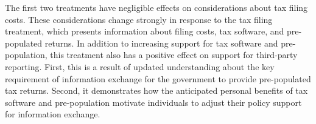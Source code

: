 \documentclass[12pt]{article}
\begin{document}
The first two treatments have negligible effects on considerations about tax filing costs. These considerations change strongly in response to the tax filing treatment, which presents information about filing costs, tax software, and pre-populated returns. In addition to increasing support for tax software and pre-population, this treatment also has a positive effect on support for third-party reporting. First, this is a result of updated understanding about the key requirement of information exchange for the government to provide pre-populated tax returns. Second, it demonstrates how the anticipated personal benefits of tax software and pre-population motivate individuals to adjust their policy support for information exchange. 


\end{document}
